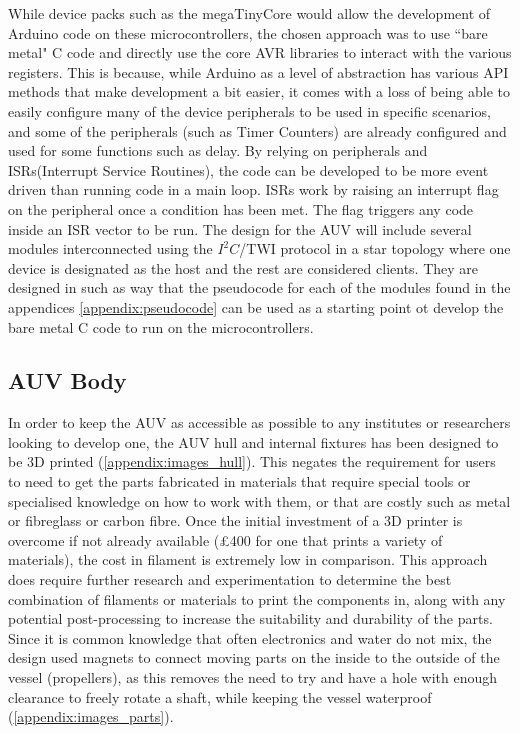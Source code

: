 \documentclass[11pt,a4paper,titlepage]{report}
\begin{document}
	While device packs such as the megaTinyCore\cite{MEGATINYCORE} would allow the development of Arduino code on these microcontrollers, the chosen approach was to use ``bare metal" C code and directly use the core AVR libraries to interact with the various registers. This is because, while Arduino as a level of abstraction has various API methods that make development a bit easier, it comes with a loss of being able to easily configure many of the device peripherals to be used in specific scenarios, and some of the peripherals (such as Timer Counters) are already configured and used for some functions such as delay. By relying on peripherals and ISRs(Interrupt Service Routines), the code can be developed to be more event driven than running code in a main loop. ISRs work by raising an interrupt flag on the peripheral once a condition has been met. The flag triggers any code inside an ISR vector to be run. The design for the AUV will include several modules interconnected using the $I^{2}C$/TWI protocol in a star topology where one device is designated as the host and the rest are considered clients. They are designed in such as way that the pseudocode for each of the modules found in the appendices \ref{appendix:pseudocode} can be used as a starting point ot develop the bare metal C code to run on the microcontrollers. 
	
	\subsection*{AUV Body}
	In order to keep the AUV as accessible as possible to any institutes or researchers looking to develop one, the AUV hull and internal fixtures has been designed to be 3D printed (\ref{appendix:images_hull}). This negates the requirement for users to need to get the parts fabricated in materials that require special tools or specialised knowledge on how to work with them, or that are costly such as metal or fibreglass or carbon fibre. Once the initial investment of a 3D printer is overcome if not already available (\unit{\approx}£400 for one that prints a variety of materials), the cost in filament is extremely low in comparison. This approach does require further research and experimentation to determine the best combination of filaments or materials to print the components in, along with any potential post-processing to increase the suitability and durability of the parts.
	Since it is common knowledge that often electronics and water do not mix, the design used magnets to connect moving parts on the inside to the outside of the vessel (propellers), as this removes the need to try and have a hole with enough clearance to freely rotate a shaft, while keeping the vessel waterproof (\ref{appendix:images_parts}). 
	
\end{document}
